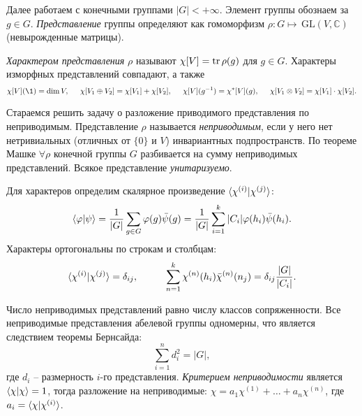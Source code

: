 
Далее работаем с конечными группами $|G| < + \infty$. Элемент группы обознаем за $g \in G$. \textit{Представление} группы определяют как гомоморфизм $\rho\colon G \mapsto \,\text{GL}(V, \mathbb{C})$ (невырожденные матрицы). 


\textit{Характером представления} $\rho$ называют $\chi[V] = \mathop{\mathrm{tr}}\nolimits \rho(g)$ для $g \in G$. Характеры изморфных представлений совпадают, а также
\begin{equation*}
	\chi[V](\1) = \dim V,
	\hspace{5 mm} 
	\chi[V_1 \oplus V_2]= \chi[V_1] + \chi[V_2],
	\hspace{5 mm} 
	\chi[V] (g^{-1}) = \chi^*[V] (g),
	\hspace{5 mm} 
	\chi[V_1 \otimes V_2] = \chi[V_1] \cdot \chi[V_2].
\end{equation*}

Стараемся решить задачу о разложение приводимого представления по неприводимым. 
Представление $\rho$ называется \textit{неприводимым}, если у него нет нетривиальных (отличных от $\{0\}$ и $V$) инвариантных подпространств. По теореме Машке $\forall \rho$ конечной группы $G$ разбивается на сумму неприводимых представлений. Всякое представление \textit{унитаризуемо}. 


Для характеров определим скалярное произведение $\bk{\chi^{(i)}}{\chi^{(j)}}$:
\begin{equation*}
\bk{\varphi}{\psi} = 
	\frac{1}{|G|} \sum_{g \in G} \varphi(g) \bar{\psi}(g) = \frac{1}{|G|} \sum_{i=1}^{k} |C_i| \varphi(h_i) \bar{\psi} (h_i).
\end{equation*}
Характеры ортогональны по строкам и столбцам:
\begin{equation*}
	\bk{\chi^{(i)}}{\chi^{(j)}} = \delta_{ij},
	\hspace{10 mm} 
	\sum_{n=1}^{k} \chi^{(n)} (h_i) \bar{\chi}^{(n)} (n_j) = \delta_{ij} \frac{|G|}{|C_i|}.
\end{equation*}


Число неприводимых представлений равно числу классов сопряженности. Все неприводимые представления абелевой группы одномерны, что является следствием теоремы Бернсайда:
\begin{equation*}
	\sum_{i=1}^{n} d_i^2 = |G|,
\end{equation*}
где $d_i$ -- размерность $i$-го представления. 
\textit{Критерием неприводимости} является $\bk{\chi}{\chi} = 1$,
тогда разложение на неприводимые: $\chi = a_1 \chi^{(1)} + \ldots + a_n \chi^{(n)}$, где $a_i = \bk{\chi}{\chi^{(i)}}$.

